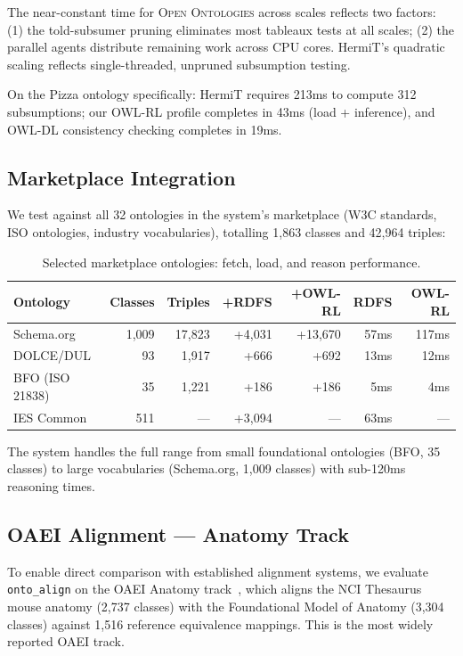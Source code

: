 \documentclass[runningheads]{llncs}
\begin{document}
The near-constant time for \textsc{Open Ontologies} across scales reflects two factors: (1) the told-subsumer pruning eliminates most tableaux tests at all scales; (2) the parallel agents distribute remaining work across CPU cores. HermiT's quadratic scaling reflects single-threaded, unpruned subsumption testing.

On the Pizza ontology specifically: HermiT requires 213ms to compute 312 subsumptions; our OWL-RL profile completes in 43ms (load + inference), and OWL-DL consistency checking completes in 19ms.

\subsection{Marketplace Integration}

We test against all 32 ontologies in the system's marketplace (W3C standards, ISO ontologies, industry vocabularies), totalling 1{,}863 classes and 42{,}964 triples:

\begin{table}[t]
\centering
\caption{Selected marketplace ontologies: fetch, load, and reason performance.}
\label{tab:marketplace}
\small
\begin{tabular}{@{}lrrrrrr@{}}
\toprule
\textbf{Ontology} & \textbf{Classes} & \textbf{Triples} & \textbf{+RDFS} & \textbf{+OWL-RL} & \textbf{RDFS} & \textbf{OWL-RL} \\
\midrule
Schema.org & 1{,}009 & 17{,}823 & +4{,}031 & +13{,}670 & 57ms & 117ms \\
DOLCE/DUL & 93 & 1{,}917 & +666 & +692 & 13ms & 12ms \\
BFO (ISO 21838) & 35 & 1{,}221 & +186 & +186 & 5ms & 4ms \\
IES Common & 511 & --- & +3{,}094 & --- & 63ms & --- \\
\bottomrule
\end{tabular}
\end{table}

The system handles the full range from small foundational ontologies (BFO, 35 classes) to large vocabularies (Schema.org, 1{,}009 classes) with sub-120ms reasoning times.

\subsection{OAEI Alignment --- Anatomy Track}

To enable direct comparison with established alignment systems, we evaluate \texttt{onto\_align} on the OAEI Anatomy track~\cite{oaei}, which aligns the NCI Thesaurus mouse anatomy (2{,}737 classes) with the Foundational Model of Anatomy (3{,}304 classes) against 1{,}516 reference equivalence mappings. This is the most widely reported OAEI track.
\end{document}
